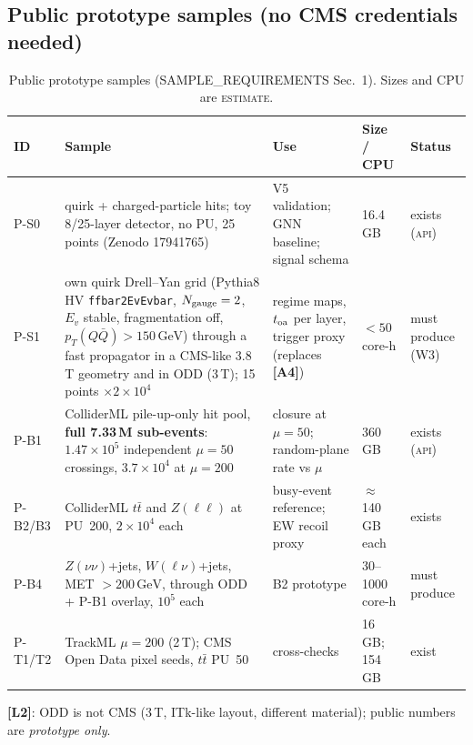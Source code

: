 \documentclass[11pt,a4paper]{article}
\newcommand{\EST}{\textsc{estimate}}
\newcommand{\GeV}{\,\mathrm{GeV}}
\newcommand{\pTQQ}{p_T(Q\bar Q)}
\newcommand{\lab}[1]{\textbf{[#1]}}
\begin{document}
\subsection{Public prototype samples (no CMS credentials needed)}
{\small
\begin{longtable}{@{}L{1.11cm}L{5.44cm}L{4.44cm}L{2.62cm}L{2.22cm}@{}}
\caption{Public prototype samples (SAMPLE\_REQUIREMENTS Sec.~1). Sizes and CPU are \EST.}\label{tab:public}\\
\toprule ID & Sample & Use & Size / CPU & Status\\\midrule\endfirsthead
\bottomrule\endfoot
P-S0 & \cite{Sha} quirk + charged-particle hits; toy 8/25-layer detector, no PU, 25 points (Zenodo 17941765) & V5 validation; GNN baseline; signal schema & 16.4\,GB & exists (\textsc{api})\\
P-S1 & own quirk Drell--Yan grid (Pythia8 HV \texttt{ffbar2EvEvbar}, $N_{\rm gauge}=2$, $E_v$ stable, fragmentation off, $\pTQQ>150\GeV$) through a fast propagator in a CMS-like 3.8\,T geometry and in ODD (3\,T); 15 points $\times2\times10^4$ & regime maps, $t_{\rm oa}$ per layer, trigger proxy (replaces \lab{A4}) & $<50$ core-h & must produce (W3)\\
P-B1 & ColliderML pile-up-only hit pool, \textbf{full 7.33\,M sub-events}: $1.47\times10^5$ independent $\mu=50$ crossings, $3.7\times10^4$ at $\mu=200$ & closure at $\mu=50$; random-plane rate vs $\mu$ & 360\,GB & exists (\textsc{api})\\
P-B2/B3 & ColliderML $t\bar t$ and $Z(\ell\ell)$ at PU~200, $2\times10^4$ each & busy-event reference; EW recoil proxy & $\approx$140\,GB each & exists\\
P-B4 & $Z(\nu\nu)$+jets, $W(\ell\nu)$+jets, MET $>200\GeV$, through ODD + P-B1 overlay, $10^5$ each & B2 prototype & 30--1000 core-h & must produce\\
P-T1/T2 & TrackML $\mu=200$ (2\,T); CMS Open Data pixel seeds, $t\bar t$ PU~50 & cross-checks & 16\,GB; 154\,GB & exist\\
\end{longtable}
}
\lab{L2}: ODD is not CMS (3\,T, ITk-like layout, different material); public numbers are \emph{prototype only}.
\end{document}

